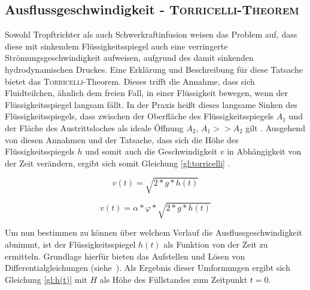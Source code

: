 \subsection{Ausflussgeschwindigkeit - \textsc{Torricelli-Theorem}}
\label{sec:torricelli}
Sowohl Tropftrichter als auch Schwerkraftinfusion weisen das Problem auf, dass diese mit sinkendem Flüssigkeitsspiegel auch eine verringerte Strömungsgeschwindigkeit aufweisen, aufgrund des damit sinkenden hydrodynamischen Druckes. 
Eine Erklärung und Beschreibung für diese Tatsache bietet das \textsc{Torricelli}-Theorem. Dieses trifft die Annahme, dass sich Fluidteilchen, ähnlich dem freien Fall, in einer Flüssigkeit bewegen, wenn der Flüssigkeitsspiegel langsam fällt. In der Praxis heißt dieses langsame Sinken des Flüssigkeitsspiegels, dass zwischen der Oberfläche des Flüssigkeitsspiegels $A_1$ und der Fläche des Austrittsloches als ideale Öffnung $A_2$, $A_1>>A_2$ gilt \cite{Kurzweil.2008}. Ausgehend von diesen Annahmen und der Tatsache, dass sich die Höhe des Flüssigkeitsspiegels $h$ und somit auch die Geschwindigkeit $v$ in Abhängigkeit von der Zeit verändern, ergibt sich somit Gleichung \eqref{gl:torricelli} \cite{tecscience.2019}.

\begin{equation}
\label{gl:torricelli}
	v(t) = \sqrt{2*g*h(t)}
\end{equation}


\begin{equation}
	\label{gl:torricelli_real}
	v(t) = \alpha*\varphi*\sqrt{2*g*h(t)}
\end{equation}


Um nun bestimmen zu können über welchem Verlauf die Ausflussgeschwindigkeit abnimmt, ist der Flüssigkeitsspiegel $h(t)$ als Funktion von der Zeit zu ermitteln. Grundlage hierfür bieten das Aufstellen und Lösen von Differentialgleichungen
\mbox{(siehe \cite{tecscience.2019})}. Als Ergebnis dieser Umformungen ergibt sich Gleichung \eqref{gl:h(t)} mit $H$ als Höhe des Füllstandes zum Zeitpunkt $t=0$.

